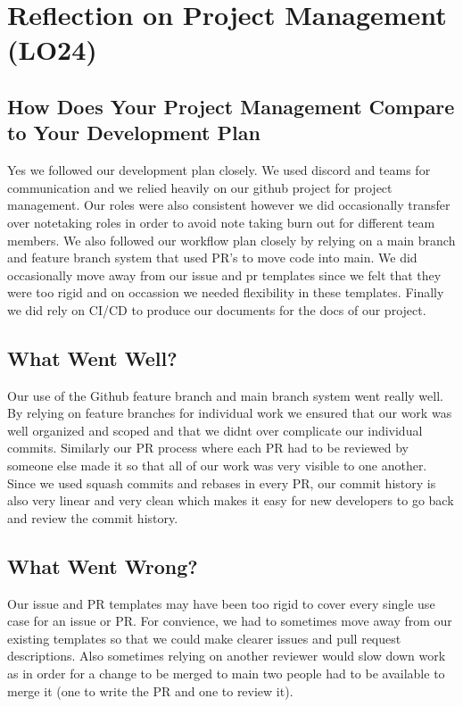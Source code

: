 \documentclass{article}
\begin{document}
\section{Reflection on Project Management (LO24)}


\subsection{How Does Your Project Management Compare to Your Development Plan}


Yes we followed our development plan closely. We used discord and teams for communication and we relied heavily on our github project for project management. Our roles were also consistent however we did occasionally transfer over notetaking roles in order to avoid note taking burn out for different team members. We also followed our workflow plan closely by relying on a main branch and feature branch system that used PR's to move code into main. We did occasionally move away from our issue and pr templates since we felt that they were too rigid and on occassion we needed flexibility in these templates. Finally we did rely on CI/CD to produce our documents for the docs of our project. 

\subsection{What Went Well?}
Our use of the Github feature branch and main branch system went really well. By relying on feature branches for individual work we ensured that our work was well organized and scoped and that we didnt over complicate our individual commits. Similarly our PR process where each PR had to be reviewed by someone else made it so that all of our work was very visible to one another. Since we used squash commits and rebases in every PR, our commit history is also very linear and very clean which makes it easy for new developers to go back and review the commit history. 

\subsection{What Went Wrong?}

Our issue and PR templates may have been too rigid to cover every single use case for an issue or PR. For convience, we had to sometimes move away from our existing templates so that we could make clearer issues and pull request descriptions. Also sometimes relying on another reviewer would slow down work as in order for a change to be merged to main two people had to be available to merge it (one to write the PR and one to review it). 
\end{document}
